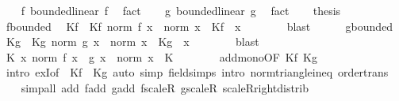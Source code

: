 \begin{isabellebody}
\ \ \isamarkupfalse%
\ f{\isacharcolon}{\kern0pt}\ bounded{\isacharunderscore}{\kern0pt}linear\ f\ \isamarkupfalse%
\ fact\isanewline
\ \ \isamarkupfalse%
\ g{\isacharcolon}{\kern0pt}\ bounded{\isacharunderscore}{\kern0pt}linear\ g\ \isamarkupfalse%
\ fact\isanewline
\ \ \isamarkupfalse%
\ {\isacharquery}{\kern0pt}thesis\isanewline
\ \ \isamarkupfalse%
\isanewline
\ \ \ \ \isamarkupfalse%
\ f{\isachardot}{\kern0pt}bounded\ \isamarkupfalse%
\ Kf\ \ Kf{\isacharcolon}{\kern0pt}\ {\isachardoublequoteopen}norm\ {\isacharparenleft}{\kern0pt}f\ x{\isacharparenright}{\kern0pt}\ {\isasymle}\ norm\ x\ {\isacharasterisk}{\kern0pt}\ Kf{\isachardoublequoteclose}\ \ x\isanewline
\ \ \ \ \ \ \isamarkupfalse%
\ blast\isanewline
\ \ \ \ \isamarkupfalse%
\ g{\isachardot}{\kern0pt}bounded\ \isamarkupfalse%
\ Kg\ \ Kg{\isacharcolon}{\kern0pt}\ {\isachardoublequoteopen}norm\ {\isacharparenleft}{\kern0pt}g\ x{\isacharparenright}{\kern0pt}\ {\isasymle}\ norm\ x\ {\isacharasterisk}{\kern0pt}\ Kg{\isachardoublequoteclose}\ \ x\isanewline
\ \ \ \ \ \ \isamarkupfalse%
\ blast\isanewline
\ \ \ \ \isamarkupfalse%
\ {\isachardoublequoteopen}{\isasymexists}K{\isachardot}{\kern0pt}\ {\isasymforall}x{\isachardot}{\kern0pt}\ norm\ {\isacharparenleft}{\kern0pt}f\ x\ {\isacharplus}{\kern0pt}\ g\ x{\isacharparenright}{\kern0pt}\ {\isasymle}\ norm\ x\ {\isacharasterisk}{\kern0pt}\ K{\isachardoublequoteclose}\isanewline
\ \ \ \ \ \ \isamarkupfalse%
\ add{\isacharunderscore}{\kern0pt}mono{\isacharbrackleft}{\kern0pt}OF\ Kf\ Kg{\isacharbrackright}{\kern0pt}\isanewline
\ \ \ \ \ \ \isamarkupfalse%
\ {\isacharparenleft}{\kern0pt}intro\ exI{\isacharbrackleft}{\kern0pt}of\ {\isacharunderscore}{\kern0pt}\ {\isachardoublequoteopen}Kf\ {\isacharplus}{\kern0pt}\ Kg{\isachardoublequoteclose}{\isacharbrackright}{\kern0pt}{\isacharparenright}{\kern0pt}\ {\isacharparenleft}{\kern0pt}auto\ simp{\isacharcolon}{\kern0pt}\ field{\isacharunderscore}{\kern0pt}simps\ intro{\isacharcolon}{\kern0pt}\ norm{\isacharunderscore}{\kern0pt}triangle{\isacharunderscore}{\kern0pt}ineq\ order{\isacharunderscore}{\kern0pt}trans{\isacharparenright}{\kern0pt}\isanewline
\ \ \isamarkupfalse%
\ {\isacharparenleft}{\kern0pt}simp{\isacharunderscore}{\kern0pt}all\ add{\isacharcolon}{\kern0pt}\ f{\isachardot}{\kern0pt}add\ g{\isachardot}{\kern0pt}add\ f{\isachardot}{\kern0pt}scaleR\ g{\isachardot}{\kern0pt}scaleR\ scaleR{\isacharunderscore}{\kern0pt}right{\isacharunderscore}{\kern0pt}distrib{\isacharparenright}{\kern0pt}\isanewline

\end{isabellebody}
